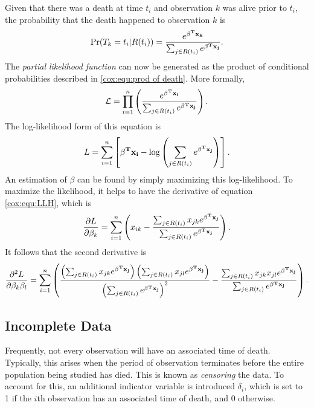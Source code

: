 Given that there was a death at time $t_i$ and observation $k$ was alive prior to $t_i$, the probability that the death happened to observation $k$  is
\begin{equation}\label{cox:equ:prod of death}
\Pr(T_k = t_i | R(t_i)) =  \frac{e^{\bold{\beta^T x_k} }}{ \sum_{j \in R(t_i)} e^{\bold{\beta^T x_j}}}.
\end{equation}
The \textit{partial likelihood function} can now be generated as the product of conditional probabilities described in \ref{cox:equ:prod of death}.  More formally,
\begin{equation}\label{cox:equ:likelihood}
\mathcal{L} = \prod_{i = 1}^n \left(  \frac{e^{\bold{\beta^T x_i} }}{ \sum_{j \in R(t_i)} e^{\bold{\beta^T x_j}}} \right).
\end{equation}
 The log-likelihood form of this equation is 
\begin{equation}\label{cox:equ:LLH}
L = \sum_{i = 1}^n \left[  \bold{\beta^T x_i} - \log\left(\sum_{j \in R(t_i)} e^{\bold{\beta^T x_j} } \right) \right].
\end{equation}
An estimation of $\beta$ can be found by simply maximizing this log-likelihood.  To maximize the likelihood, it helps to have the derivative of equation \ref{cox:equ:LLH}, which is 
\begin{equation}\label{cox:equ:LLH derivative}
\frac{\partial L}{\partial \beta_k} = \sum_{i = 1}^n \left( x_{ik} - \frac{\sum_{j \in R(t_i)} x_{jk} e^{\bold{\beta^T x_j} } }{\sum_{j \in R(t_i)} e^{\bold{\beta^T x_j} } } \right).
\end{equation}
It follows that the second derivative is
\begin{equation}\label{cox:equ:LLH second derivative}
\frac{\partial^2 L}{\partial \beta_k \beta_l} = \sum_{i = 1}^n \left(  \frac{\left(  \sum_{j \in R(t_i)} x_{jk} e^{\bold{\beta^T x_j} } \right) \left(  \sum_{j \in R(t_i)} x_{jl} e^{\bold{\beta^T x_j} } \right)}{\left( \sum_{j \in R(t_i)} e^{\bold{\beta^T x_j} } \right)^2 }   -  \frac{  \sum_{j \in R(t_i)} x_{jk}x_{jl} e^{\bold{\beta^T x_j} } }{\sum_{j \in R(t_i)} e^{\bold{\beta^T x_j} } } \right).
\end{equation}  

\subsection{Incomplete Data}
Frequently, not every observation will have an associated time of death.  Typically, this arises when the period of observation terminates before the entire population being studied has died.  This is known as \textit{censoring} the data.  To account for this, an additional indicator variable is introduced $\delta_i$, which is set to 1 if the $i$th observation has an associated time of death, and 0 otherwise.

